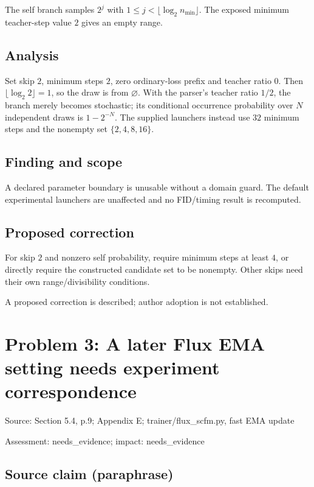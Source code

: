 \documentclass[11pt]{article}
\begin{document}
The self branch samples \(2^j\) with \(1\le j<\lfloor\log_2 n_{\min}\rfloor\). The exposed minimum teacher-step value \(2\) gives an empty range.

\subsection*{Analysis}

Set skip \(2\), minimum steps \(2\), zero ordinary-loss prefix and teacher ratio \(0\). Then \(\lfloor\log_2 2\rfloor=1\), so the draw is from \(\varnothing\). With the parser’s teacher ratio \(1/2\), the branch merely becomes stochastic; its conditional occurrence probability over \(N\) independent draws is \(1-2^{-N}\). The supplied launchers instead use \(32\) minimum steps and the nonempty set \(\{2,4,8,16\}\).

\subsection*{Finding and scope}

A declared parameter boundary is unusable without a domain guard. The default experimental launchers are unaffected and no FID/timing result is recomputed.

\subsection*{Proposed correction}

For skip \(2\) and nonzero self probability, require minimum steps at least \(4\), or directly require the constructed candidate set to be nonempty. Other skips need their own range/divisibility conditions.

A proposed correction is described; author adoption is not established.

\section*{Problem 3: A later Flux EMA setting needs experiment correspondence}

Source: Section 5.4, p.9; Appendix E; trainer/flux\_scfm.py, fast EMA update

Assessment: needs\_evidence; impact: needs\_evidence

\subsection*{Source claim (paraphrase)}
\end{document}
